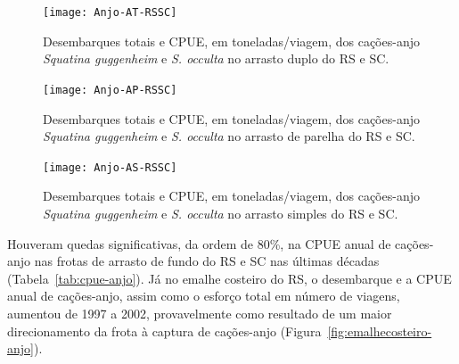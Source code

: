 \documentclass[a4paper,11pt,twoside,showtrims,onecolumn,openright,final]{memoir}
\begin{document}

%
%

\begin{figure}
\begin{center}
\texttt{[image: Anjo-AT-RSSC]}
\end{center}
\caption[Desembarques totais e CPUE dos cações-anjo no arrasto duplo do RS e SC.]
        {Desembarques totais e CPUE, em toneladas/viagem, 
	 dos cações-anjo \emph{Squatina guggenheim} e \emph{S. occulta} no arrasto duplo do RS e SC.}
\label{fig:tangone-anjo}
\end{figure}


%
%

\begin{figure}
\begin{center}
\texttt{[image: Anjo-AP-RSSC]}
\end{center}
\caption[Desembarques totais e CPUE dos cações-anjo no arrasto de parelha do RS e SC.]
        {Desembarques totais e CPUE, em toneladas/viagem, 
	 dos cações-anjo \emph{Squatina guggenheim} e \emph{S. occulta} no arrasto de parelha do RS e SC.}
\label{fig:parelha-anjo}
\end{figure}


%
%

\begin{figure}
\begin{center}
\texttt{[image: Anjo-AS-RSSC]}
\end{center}
\caption[Desembarques totais e CPUE dos cações-anjo no arrasto simples do RS e SC.]
        {Desembarques totais e CPUE, em toneladas/viagem, 
	 dos cações-anjo \emph{Squatina guggenheim} e \emph{S. occulta} no arrasto simples do RS e SC.}
\label{fig:simples-anjo}
\end{figure}


Houveram quedas significativas, da ordem de 80\%, na CPUE anual de cações-anjo nas 
frotas de arrasto de fundo do RS e SC nas últimas décadas (Tabela~\ref{tab:cpue-anjo}). 
Já no emalhe costeiro do RS, o desembarque e a CPUE anual de cações-anjo, 
assim como o esforço total em número de viagens,  aumentou de 1997 a 2002, 
provavelmente como resultado de um maior direcionamento da 
frota à captura de cações-anjo (Figura~\ref{fig:emalhecosteiro-anjo}). 
\end{document}
